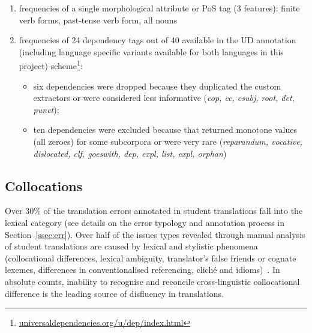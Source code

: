 \begin{enumerate}
	\item frequencies of a single morphological attribute or PoS tag (3 features): finite verb forms, past-tense verb form, all nouns 
	
	\item frequencies of 24 dependency tags out of 40 available in the UD annotation (including language specific variants available for both languages in this project) scheme\footnote{\url{universaldependencies.org/u/dep/index.html}}:
	\begin{itemize}
		\item six dependencies were dropped because they duplicated the custom extractors or were considered less informative (\textit{cop, cc, csubj, root, det, punct});
		\item ten dependencies were excluded because that returned monotone values (all zeroes) for some subcorpora or were very rare (\textit{reparandum, vocative, dislocated, clf, goeswith, dep, expl, list, expl, orphan})
	\end{itemize} 
	
\end{enumerate}

\subsection{\label{ssec:coll}Collocations}


Over 30\% of the translation errors annotated in student translations fall into the lexical category (see details on the error typology and annotation process in Section~\ref{ssec:err}). Over half of the issues types revealed through manual analysis of student translations are caused by lexical and stylistic phenomena (collocational differences, lexical ambiguity, translator's false friends or cognate lexemes, differences in conventionalised referencing, cliché and idioms)~\cite[Table 5, p.22]{Kunilovskaya2022err}. In absolute counts, inability to recognise and reconcile cross-linguistic collocational difference is the leading source of disfluency in translations. 

